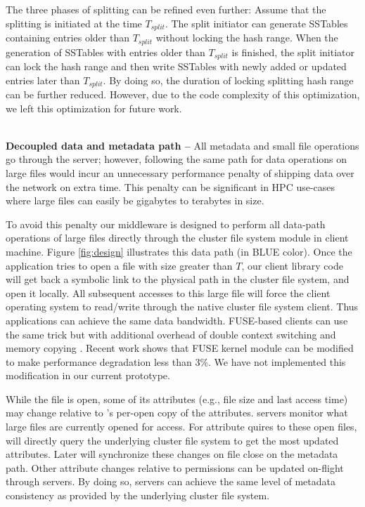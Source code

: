 The three phases of splitting can be refined even further:
Assume that the splitting is initiated at the time $T_{split}$.
The split initiator can generate SSTables containing entries
older than $T_{split}$ without locking the hash range.
When the generation of SSTables with entries older than $T_{split}$ is finished,
the split initiator can lock the hash range and then write SSTables with
newly added or updated entries later than $T_{split}$.
By doing so, the duration of locking splitting hash range can be further reduced.
However, due to the code complexity of this optimization,
we left this optimization for future work.

~\\
\textbf{Decoupled data and metadata path -- }
All metadata and small file operations go through the \giga server;
however, following the same path for data operations on large files
would incur an unnecessary performance penalty of shipping data over the network on extra time.
This penalty can be significant in HPC use-cases
where large files can easily be gigabytes to terabytes in size.

To avoid this penalty our middleware is designed to perform all
data-path operations of large files directly
through the cluster file system module in client machine.
Figure \ref{fig:design} illustrates this data path (in BLUE color).
Once the application tries to open a file with size greater than $T$,
our client library code will get back a symbolic link to the physical
path in the cluster file system, and open it locally.
All subsequent accesses to this large file will force
the client operating system to read/write through the native cluster file system client.
Thus applications can achieve the same data bandwidth.
FUSE-based clients can use the same trick but with additional overhead
of double context switching and memory copying \cite{PLFS}.
Recent work \cite{fuseopt} shows that FUSE kernel module can be modified
to make performance degradation less than $3\%$. We have not implemented
this modification in our current prototype.

While the file is open, some of its attributes (e.g., file size and last access time)
may change relative to \tfs's per-open copy of the attributes.
\giga servers monitor what large files are currently opened for access.
For attribute quires to these open files, \giga will directly query the underlying
cluster file system to get the most updated attributes.
Later \giga will synchronize these changes on file close on the metadata path.
Other attribute changes relative to permissions can be updated on-flight
through \giga servers.
By doing so, \giga servers can achieve the same level of metadata consistency
as provided by the underlying cluster file system.


